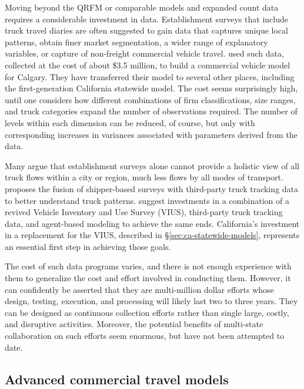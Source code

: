 Moving beyond the QRFM or comparable models and expanded count data requires a considerable investment in data. Establishment surveys that include truck travel diaries are often suggested to gain data that captures unique local patterns, obtain finer market segmentation, a wider range of explanatory variables, or capture of non-freight commercial vehicle travel. \cite{hunt07} used such data, collected at the cost of about \$3.5 million, to build a commercial vehicle model for Calgary. They have transferred their model to several other places, including the first-generation California statewide model. The cost seems surprisingly high, until one considers how different combinations of firm classifications, size ranges, and truck categories expand the number of observations required. The number of levels within each dimension can be reduced, of course, but only with corresponding increases in variances associated with parameters derived from the data.

Many argue that establishment surveys alone cannot provide a holistic view of all truck flows within a city or region, much less flows by all modes of transport. \cite{roorda11} proposes the fusion of shipper-based surveys with third-party truck tracking data to better understand truck patterns. \cite{zmud14} suggest investments in a combination of a revived Vehicle Inventory and Use Survey (VIUS), third-party truck tracking data, and agent-based modeling to achieve the same ends. California's investment in a replacement for the VIUS, described in \S\ref{sec:ca-statewide-models}, represents an essential first step in achieving those goals.

The cost of such data programs varies, and there is not enough experience with them to generalize the cost and effort involved in conducting them. However, it can confidently be asserted that they are multi-million dollar efforts whose design, testing, execution, and processing will likely last two to three years. They can be designed as continuous collection efforts rather than single large, costly, and disruptive activities. Moreover, the potential benefits of multi-state collaboration on such efforts seem enormous, but have not been attempted to date.

\subsection{Advanced commercial travel models}

